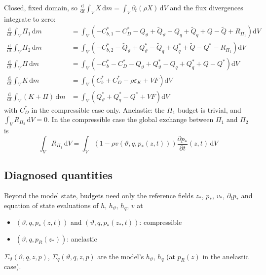 \documentclass{article}
\begin{document}
Closed, fixed domain, so \(\frac{\mathrm{d}}{\mathrm{d} t} \int_V X \, \mathrm{d}m = \int_V \partial_t (\rho X) \, \mathrm{d}V\) and the flux divergences integrate to zero:
\begin{align}
    \frac{\mathrm{d}}{\mathrm{d} t} \int_V \Pi_1 \, \mathrm{d}m
    & =
    \int_V \left(
        - C_{b,1}^*
        - C_D^*
        - Q_\vartheta + \tilde{Q}_\vartheta
        - Q_q + \tilde{Q}_q
        + Q - \tilde{Q}
        + R_{\Pi_1}
    \right) \mathrm{d}V
    \\
    \frac{\mathrm{d}}{\mathrm{d} t} \int_V \Pi_2 \, \mathrm{d}m
    & =
    \int_V \left(
        - C_{b,2}^*
        - \tilde{Q}_\vartheta + Q_\vartheta^*
        - \tilde{Q}_q + Q_q^*
        + \tilde{Q} - Q^*
        - R_{\Pi_1}
    \right) \mathrm{d}V
    \\
    \frac{\mathrm{d}}{\mathrm{d} t} \int_V \Pi \, \mathrm{d}m
    & =
    \int_V \left(
        - C_b^* - C_D^*
        - Q_\vartheta + Q_\vartheta^*
        - Q_q + Q_q^*
        + Q - Q^*
    \right) \mathrm{d}V
    \\
    \frac{\mathrm{d}}{\mathrm{d} t} \int_V K \, \mathrm{d}m
    & =
    \int_V \left(
        C_b^* + C_D^*
        - \rho \varepsilon_K
        + VF
    \right) \mathrm{d}V
    \\
    \frac{\mathrm{d}}{\mathrm{d} t} \int_V (K + \Pi) \, \mathrm{d}m
    & =
    \int_V \left(
        Q_\vartheta^* + Q_q^* - Q^*
        + VF
    \right) \mathrm{d}V
\end{align}
with \(C_D^*\) in the compressible case only.
Anelastic: the \(\Pi_1\) budget is trivial, and \(\int_V R_{\Pi_2} \, \mathrm{d}V = 0\).
In the compressible case the global exchange between \(\Pi_1\) and \(\Pi_2\) is
\begin{equation}
    \int_V R_{\Pi_1} \, \mathrm{d}V
    =
    \int_V \left( 1 - \rho v(\vartheta, q, p_*(z, t)) \right) \frac{\partial p_*}{\partial t}(z, t) \, \mathrm{d}V
\end{equation}

\subsection{Diagnosed quantities}
Beyond the model state, budgets need only the reference fields \(z_*\), \(p_*\), \(v_*\), \(\partial_t p_*\) and equation of state evaluations of \(h\), \(h_\vartheta\), \(h_q\), \(v\) at
\begin{itemize}
    \item \((\vartheta, q, p_*(z, t))\) and \((\vartheta, q, p_*(z_*, t))\): compressible
    \item \((\vartheta, q, p_R(z_*))\): anelastic
\end{itemize}
\(\Sigma_\vartheta(\vartheta, q, z, p)\), \(\Sigma_q(\vartheta, q, z, p)\) are the model's \(h_\vartheta\), \(h_q\) (at \(p_R(z)\) in the anelastic case).
\end{document}
